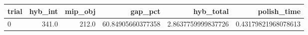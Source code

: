 \begin{tabular}{lrrrrr}
\hline
trial & hyb_int & mip_obj & gap_pct & hyb_total & polish_time \\ \hline
0 & 341.0 & 212.0 & 60.84905660377358 & 2.8637759999837726 & 0.43179821968078613 \\
\hline
\end{tabular}
